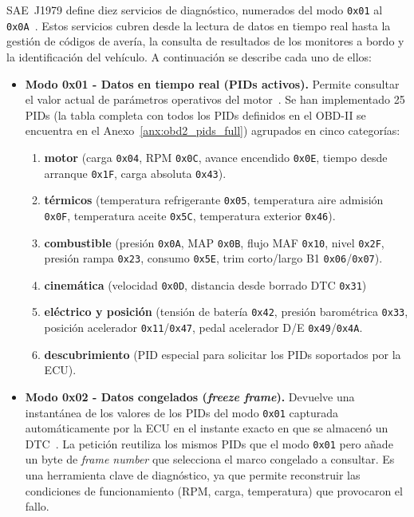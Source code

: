 SAE~J1979 define diez servicios de diagnóstico, numerados del modo \texttt{0x01} al \texttt{0x0A}~\cite{SAEJ1979:2014}. Estos servicios cubren desde la lectura de datos en tiempo real hasta la gestión de códigos de avería, la consulta de resultados de los monitores a bordo y la identificación del vehículo. A continuación se describe cada uno de ellos:

\begin{itemize}
    \item \textbf{Modo 0x01 - Datos en tiempo real (PIDs activos).} Permite consultar el valor actual de parámetros operativos del motor~\cite{SAEJ1979:2014}. Se han implementado 25 PIDs (la tabla completa con todos los PIDs definidos en el OBD-II se encuentra en el Anexo~\ref{anx:obd2_pids_full}) agrupados en cinco categorías: 
    \begin{enumerate}
        \item \textbf{motor} (carga \texttt{0x04}, RPM \texttt{0x0C}, avance encendido \texttt{0x0E}, tiempo desde arranque \texttt{0x1F}, carga absoluta \texttt{0x43}).
        \item \textbf{térmicos} (temperatura refrigerante \texttt{0x05}, temperatura aire admisión \texttt{0x0F}, temperatura aceite \texttt{0x5C}, temperatura exterior \texttt{0x46}).
        \item \textbf{combustible} (presión \texttt{0x0A}, MAP \texttt{0x0B}, flujo MAF \texttt{0x10}, nivel \texttt{0x2F}, presión rampa \texttt{0x23}, consumo \texttt{0x5E}, trim corto/largo B1 \texttt{0x06}/\texttt{0x07}).
        \item \textbf{cinemática} (velocidad \texttt{0x0D}, distancia desde borrado DTC \texttt{0x31})
        \item \textbf{eléctrico y posición} (tensión de batería \texttt{0x42}, presión barométrica \texttt{0x33}, posición acelerador \texttt{0x11}/\texttt{0x47}, pedal acelerador D/E \texttt{0x49}/\texttt{0x4A}.
        \item \textbf{descubrimiento} (PID especial para solicitar los PIDs soportados por la ECU).
    \end{enumerate}

    \item \textbf{Modo 0x02 - Datos congelados (\textit{freeze frame}).} Devuelve una instantánea de los valores de los PIDs del modo \texttt{0x01} capturada automáticamente por la ECU en el instante exacto en que se almacenó un DTC~\cite{SAEJ1979:2014}. La petición reutiliza los mismos PIDs que el modo \texttt{0x01} pero añade un byte de \textit{frame number} que selecciona el marco congelado a consultar. Es una herramienta clave de diagnóstico, ya que permite reconstruir las condiciones de funcionamiento (RPM, carga, temperatura) que provocaron el fallo.


\end{itemize}
